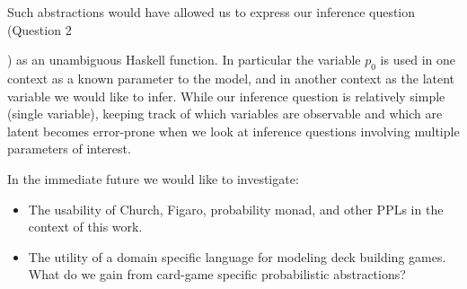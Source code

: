 Such abstractions would have allowed
us to express our inference question (Question 2\ignore{\ref{q:inference}}) as an
unambiguous Haskell function. In particular the variable $p_0$ is used in
one context as a known parameter to the model, and in another context as
the latent variable we would like to infer. While our inference question
is relatively simple (single variable), keeping track of which variables
are observable and which are latent becomes error-prone when we look at
inference questions involving multiple parameters of interest.




In the immediate future we would like to investigate:

\begin{itemize}
\item The usability of Church, Figaro, probability monad, and other
      PPLs in the context of this work.
\item The utility of a domain specific language for modeling deck building
      games. What do we gain from card-game specific probabilistic
      abstractions?
\end{itemize}



